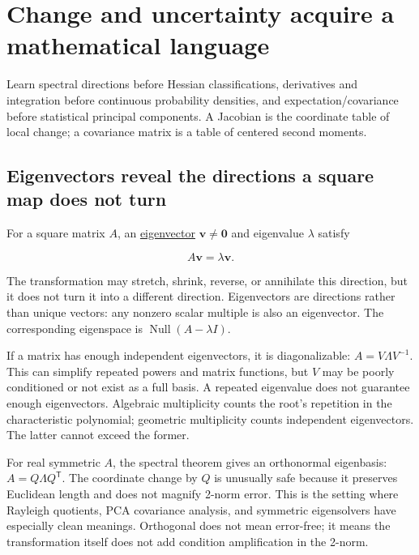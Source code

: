 \section{Change and uncertainty acquire a mathematical language}\label{01-foundations-i-ch020-change-and-uncertainty-acquire-a-mathematical-language}

Learn spectral directions before Hessian classifications, derivatives and integration before continuous probability densities, and expectation/covariance before statistical principal components. A Jacobian is the coordinate table of local change; a covariance matrix is a table of centered second moments.

\subsection{Eigenvectors reveal the directions a square map does not turn}\label{01-foundations-i-ch020-eigenvectors-reveal-the-directions-a-square-map-does-not-turn}

For a square matrix \(A\), an \hyperref[01-foundations-i-ch020-eigenvalues-eigenspaces-and-the-two-kinds-of-multiplicity]{eigenvector} \(\mathbf v\ne\mathbf0\) and eigenvalue \(\lambda\) satisfy

\[
A\mathbf v=\lambda\mathbf v.
\]

The transformation may stretch, shrink, reverse, or annihilate this direction, but it does not turn it into a different direction. Eigenvectors are directions rather than unique vectors: any nonzero scalar multiple is also an eigenvector. The corresponding eigenspace is \(\operatorname{Null}(A-\lambda I)\).

If a matrix has enough independent eigenvectors, it is diagonalizable: \(A=V\Lambda V^{-1}\). This can simplify repeated powers and matrix functions, but \(V\) may be poorly conditioned or not exist as a full basis. A repeated eigenvalue does not guarantee enough eigenvectors. Algebraic multiplicity counts the root's repetition in the characteristic polynomial; geometric multiplicity counts independent eigenvectors. The latter cannot exceed the former.

For real symmetric \(A\), the spectral theorem gives an orthonormal eigenbasis: \(A=Q\Lambda Q^\mathsf T\). The coordinate change by \(Q\) is unusually safe because it preserves Euclidean length and does not magnify 2-norm error. This is the setting where Rayleigh quotients, PCA covariance analysis, and symmetric eigensolvers have especially clean meanings. Orthogonal does not mean error-free; it means the transformation itself does not add condition amplification in the 2-norm.

